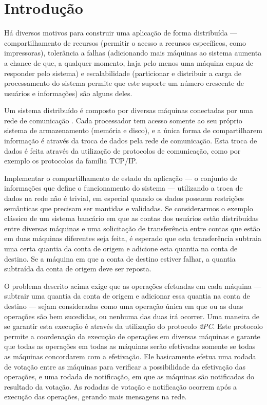 \documentclass[11pt,twoside,a4paper]{book}
\begin{document}
\mainmatter

\fancyhead[RE,LO]{\thesection}

\singlespacing              %

\chapter{Introdução}
\label{chap:introducao}
Há diversos motivos para construir uma aplicação de forma distribuída --- compartilhamento de recursos (permitir o acesso a recursos específicos, como impressoras), tolerância a falhas (adicionando mais máquinas ao sistema aumenta a chance de que, a qualquer momento, haja pelo menos uma máquina capaz de responder pelo sistema) e escalabilidade (particionar e distribuir a carga de processamento do sistema permite que este suporte um número crescente de usuários e informações) são alguns deles.

Um sistema distribuído é composto por diversas máquinas conectadas por uma rede de comunicação \cite{tanenbaum}. Cada processador tem acesso somente ao seu próprio sistema de armazenamento (memória e disco), e a única forma de compartilharem informação é através da troca de dados pela rede de comunicação. Esta troca de dados é feita através da utilização de protocolos de comunicação, como por exemplo os protocolos da família TCP/IP.

Implementar o compartilhamento de estado da aplicação --- o conjunto de informações que define o funcionamento do sistema --- utilizando a troca de dados na rede não é trivial, em especial quando os dados possuem restrições semânticas que precisam ser mantidas e validadas. Se considerarmos o exemplo clássico de um sistema bancário em que as contas dos usuários estão distribuídas entre diversas máquinas e uma solicitação de transferência entre contas que estão em duas máquinas diferentes seja feita, é esperado que esta transferência subtraia uma certa quantia da conta de origem e adicione esta quantia na conta de destino. Se a máquina em que a conta de destino estiver falhar, a quantia subtraída da conta de origem deve ser reposta.

O problema descrito acima exige que as operações efetuadas em cada máquina --- subtrair uma quantia da conta de origem e adicionar essa quantia na conta de destino --- sejam consideradas como uma operação única em que ou as duas operações são bem sucedidas, ou nenhuma das duas irá ocorrer. Uma maneira de se garantir esta execução é através da utilização do protocolo \emph{2PC}. Este protocolo permite a coordenação da execução de operações em diversas máquinas e garante que todas as operações em todas as máquinas serão efetivadas somente se todas as máquinas concordarem com a efetivação. Ele basicamente efetua uma rodada de votação entre as máquinas para verificar a possibilidade da efetivação das operações, e uma rodada de notificação, em que as máquinas são notificadas do resultado da votação. As rodadas de votação e notificação ocorrem após a execução das operações, gerando mais mensagens na rede.
\end{document}
